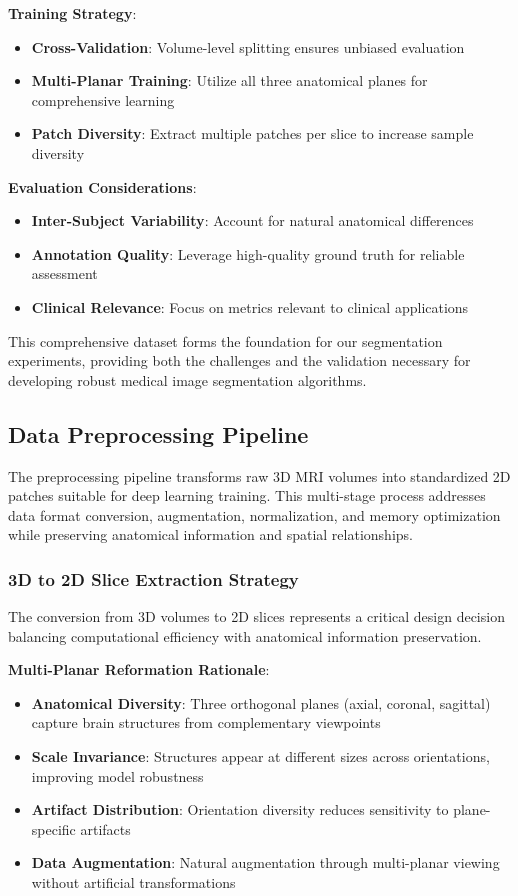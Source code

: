 \documentclass[12pt,a4paper]{article}
\begin{document}
\textbf{Training Strategy}:
\begin{itemize}
    \item \textbf{Cross-Validation}: Volume-level splitting ensures unbiased evaluation
    \item \textbf{Multi-Planar Training}: Utilize all three anatomical planes for comprehensive learning
    \item \textbf{Patch Diversity}: Extract multiple patches per slice to increase sample diversity
\end{itemize}

\textbf{Evaluation Considerations}:
\begin{itemize}
    \item \textbf{Inter-Subject Variability}: Account for natural anatomical differences
    \item \textbf{Annotation Quality}: Leverage high-quality ground truth for reliable assessment
    \item \textbf{Clinical Relevance}: Focus on metrics relevant to clinical applications
\end{itemize}

This comprehensive dataset forms the foundation for our segmentation experiments, providing both the challenges and the validation necessary for developing robust medical image segmentation algorithms.

\subsection{Data Preprocessing Pipeline}

The preprocessing pipeline transforms raw 3D MRI volumes into standardized 2D patches suitable for deep learning training. This multi-stage process addresses data format conversion, augmentation, normalization, and memory optimization while preserving anatomical information and spatial relationships.

\subsubsection{3D to 2D Slice Extraction Strategy}

The conversion from 3D volumes to 2D slices represents a critical design decision balancing computational efficiency with anatomical information preservation.

\textbf{Multi-Planar Reformation Rationale}:
\begin{itemize}
    \item \textbf{Anatomical Diversity}: Three orthogonal planes (axial, coronal, sagittal) capture brain structures from complementary viewpoints
    \item \textbf{Scale Invariance}: Structures appear at different sizes across orientations, improving model robustness
    \item \textbf{Artifact Distribution}: Orientation diversity reduces sensitivity to plane-specific artifacts
    \item \textbf{Data Augmentation}: Natural augmentation through multi-planar viewing without artificial transformations
\end{itemize}
\end{document}
